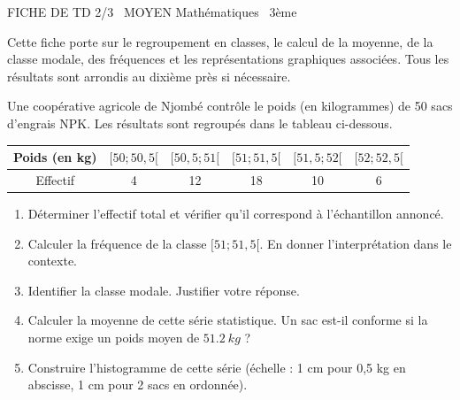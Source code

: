 \documentclass[11pt]{article}
\begin{document}
\begin{tcolorbox}[enhanced,colback=popink,colframe=popink,arc=10pt,boxrule=0pt,left=12pt,right=12pt,top=9pt,bottom=9pt]
{\color{white}\popxbold\small FICHE DE TD 2/3 \textbullet\ MOYEN \hfill Mathématiques \textbullet\ 3ème\par}
\end{tcolorbox}
\vspace{4pt}
\noindent Cette fiche porte sur le regroupement en classes, le calcul de la moyenne, de la classe modale, des fréquences et les représentations graphiques associées. Tous les résultats sont arrondis au dixième près si nécessaire.

\begin{exercice}
Une coopérative agricole de Njombé contrôle le poids (en kilogrammes) de 50 sacs d'engrais NPK. Les résultats sont regroupés dans le tableau ci-dessous.

\begin{center}
\begin{tabular}{|c|c|c|c|c|c|}
\hline
Poids (en kg) & $[50; 50,5[$ & $[50,5; 51[$ & $[51; 51,5[$ & $[51,5; 52[$ & $[52; 52,5[$ \\
\hline
Effectif & 4 & 12 & 18 & 10 & 6 \\
\hline
\end{tabular}
\end{center}

\begin{enumerate}
    \item Déterminer l'effectif total et vérifier qu'il correspond à l'échantillon annoncé.
    \item Calculer la fréquence de la classe $[51; 51,5[$. En donner l'interprétation dans le contexte.
    \item Identifier la classe modale. Justifier votre réponse.
    \item Calculer la moyenne de cette série statistique. Un sac est-il conforme si la norme exige un poids moyen de $\SI{51,2}{kg}$ ?
    \item Construire l'histogramme de cette série (échelle : 1 cm pour 0,5 kg en abscisse, 1 cm pour 2 sacs en ordonnée).
\end{enumerate}
\end{exercice}
\end{document}
